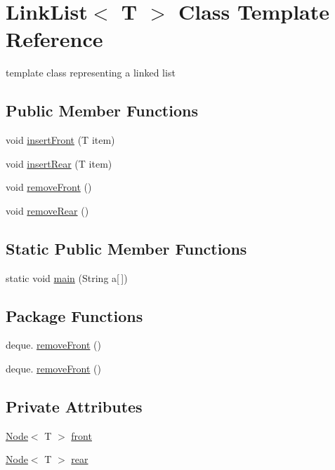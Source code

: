 \hypertarget{classLinkList}{}\section{Link\+List$<$ T $>$ Class Template Reference}
\label{classLinkList}


template class representing a linked list  


\subsection*{Public Member Functions}
\begin{DoxyCompactItemize}
\item 
void \hyperlink{classLinkList_a38b2e77462f2733bc9254c3fd86b453f}{insert\+Front} (T item)
\item 
void \hyperlink{classLinkList_af0f013b563ae0abaec5c22037ec31e28}{insert\+Rear} (T item)
\item 
void \hyperlink{classLinkList_ae4d698669105fff350b578de53e7e389}{remove\+Front} ()
\item 
void \hyperlink{classLinkList_af7894809851c2478fdb3272bd0584b6c}{remove\+Rear} ()
\end{DoxyCompactItemize}
\subsection*{Static Public Member Functions}
\begin{DoxyCompactItemize}
\item 
static void \hyperlink{classLinkList_a62eb2e6bd32c8bdaa9bd26b5cef6c2c8}{main} (String a\mbox{[}$\,$\mbox{]})
\end{DoxyCompactItemize}
\subsection*{Package Functions}
\begin{DoxyCompactItemize}
\item 
deque. \hyperlink{classLinkList_a520953edc7f7c9c798ebdc3fad26df52}{remove\+Front} ()
\item 
deque. \hyperlink{classLinkList_a520953edc7f7c9c798ebdc3fad26df52}{remove\+Front} ()
\end{DoxyCompactItemize}
\subsection*{Private Attributes}
\begin{DoxyCompactItemize}
\item 
\hyperlink{classNode}{Node}$<$ T $>$ \hyperlink{classLinkList_a9c8c193c200e3f98e811d75a34481aa5}{front}
\item 
\hyperlink{classNode}{Node}$<$ T $>$ \hyperlink{classLinkList_a43583d89b1ad2305fc5787d4c637a377}{rear}
\end{DoxyCompactItemize}


